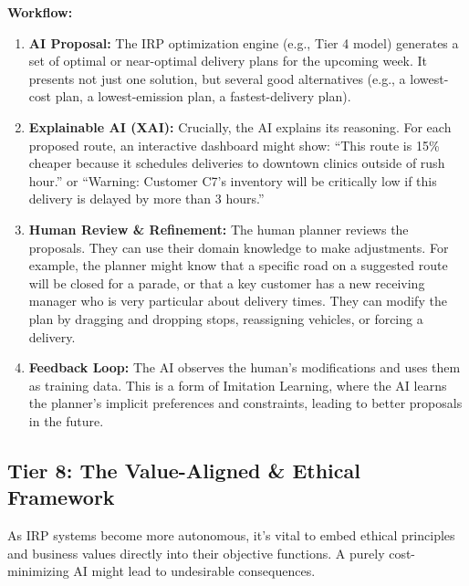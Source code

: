 \documentclass{article}
\begin{document}
\textbf{Workflow:}
\begin{enumerate}
    \item \textbf{AI Proposal:} The IRP optimization engine (e.g., Tier 4 model) generates a set of optimal or near-optimal delivery plans for the upcoming week. It presents not just one solution, but several good alternatives (e.g., a lowest-cost plan, a lowest-emission plan, a fastest-delivery plan).
    \item \textbf{Explainable AI (XAI):} Crucially, the AI explains its reasoning. For each proposed route, an interactive dashboard might show: ``This route is 15\% cheaper because it schedules deliveries to downtown clinics outside of rush hour.'' or ``Warning: Customer C7's inventory will be critically low if this delivery is delayed by more than 3 hours.''
    \item \textbf{Human Review \& Refinement:} The human planner reviews the proposals. They can use their domain knowledge to make adjustments. For example, the planner might know that a specific road on a suggested route will be closed for a parade, or that a key customer has a new receiving manager who is very particular about delivery times. They can modify the plan by dragging and dropping stops, reassigning vehicles, or forcing a delivery.
    \item \textbf{Feedback Loop:} The AI observes the human's modifications and uses them as training data. This is a form of Imitation Learning, where the AI learns the planner's implicit preferences and constraints, leading to better proposals in the future.
\end{enumerate}

\subsection{Tier 8: The Value-Aligned \& Ethical Framework}

As IRP systems become more autonomous, it's vital to embed ethical principles and business values directly into their objective functions. A purely cost-minimizing AI might lead to undesirable consequences.
\end{document}
